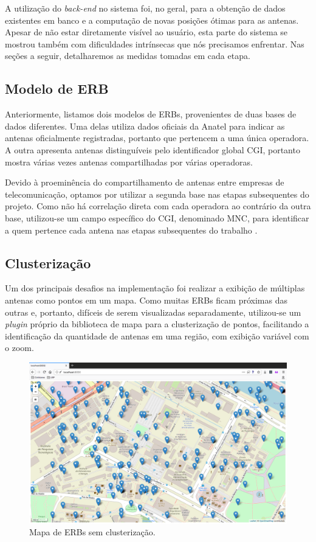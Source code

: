 \documentclass[]{politex}
\begin{document}
A utilização do \textit{back-end} no sistema foi, no geral, para a obtenção de
dados existentes em banco e a computação de novas posições ótimas para as antenas.
Apesar de não estar diretamente visível ao usuário, esta parte do sistema se
mostrou também com dificuldades intrínsecas que nós precisamos enfrentar. Nas
seções a seguir, detalharemos as medidas tomadas em cada etapa.

\subsection{Modelo de ERB}

Anteriormente, listamos dois modelos de ERBs, provenientes de duas bases de
dados diferentes. Uma delas utiliza dados oficiais da Anatel para indicar as
antenas oficialmente registradas, portanto que pertencem a uma única operadora.
A outra apresenta antenas distinguíveis pelo identificador global CGI, portanto
mostra várias vezes antenas compartilhadas por várias operadoras.

Devido à proeminência do compartilhamento de antenas entre empresas de
telecomunicação, optamos por utilizar a segunda base nas etapas subsequentes do
projeto. Como não há correlação direta com cada operadora ao contrário da outra
base, utilizou-se um campo específico do CGI, denominado MNC, para identificar a
quem pertence cada antena nas etapas subsequentes do trabalho \cite{mcc-mnc}.

\subsection{Clusterização}

Um dos principais desafios na implementação foi realizar a exibição de múltiplas
antenas como pontos em um mapa. Como muitas ERBs ficam próximas das outras e,
portanto, difíceis de serem visualizadas separadamente, utilizou-se um
\textit{plugin} próprio da biblioteca de mapa para a clusterização de pontos,
facilitando a identificação da quantidade de antenas em uma região, com exibição
variável com o zoom.

\begin{figure}[H]
    \centering
    \includegraphics[width=6in]{imagens/mapa_sem_clusters}
    \caption{Mapa de ERBs sem clusterização.}
    \label{fig:mapa_sem_clusters}
\end{figure}
\end{document}
